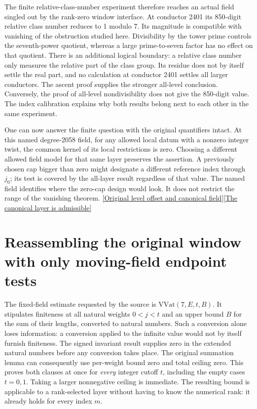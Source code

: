 \documentclass[12pt,letterpaper]{article}
\begin{document}
The finite relative-class-number experiment therefore reaches an actual field singled out by the rank-zero window interface. At conductor 2401 its 850-digit relative class number reduces to 1 modulo 7. Its magnitude is compatible with vanishing of the obstruction studied here. Divisibility by the tower prime controls the seventh-power quotient, whereas a large prime-to-seven factor has no effect on that quotient. There is an additional logical boundary: a relative class number only measures the relative part of the class group. Its residue does not by itself settle the real part, and no calculation at conductor 2401 settles all larger conductors. The ascent proof supplies the stronger all-level conclusion. Conversely, the proof of all-level nondivisibility does not give the 850-digit value. The index calibration explains why both results belong next to each other in the same experiment.

One can now answer the finite question with the original quantifiers intact. At this named degree-2058 field, for any allowed local datum with a nonzero integer twist, the common kernel of its local restrictions is zero. Choosing a different allowed field model for that same layer preserves the assertion. A previously chosen cap bigger than zero might designate a different reference index through \(j_0\); its test is covered by the all-layer result regardless of that value. The named field identifies where the zero-cap design would look. It does not restrict the range of the vanishing theorem. \href{https://github.com/nousentllc/riemann-hypothesis/blob/40e56bab026552e089d7afcfeff08d2defb9c005/src/Development/AutomorphicArithmetic/AutomorphicVarieties/NumberFieldTowers/XTwApplyApply.lean#L104-L116}{[Original level offset and canonical field]}\quad\href{https://github.com/nousentllc/riemann-hypothesis/blob/40e56bab026552e089d7afcfeff08d2defb9c005/src/Development/AutomorphicArithmetic/AutomorphicVarieties/NumberFieldTowers/LayerUniq.lean#L25-L29}{[The canonical layer is admissible]}

\section{Reassembling the original window with only moving-field endpoint tests}
\label{sec:only-moving}

The fixed-field estimate requested by the source is \(\mathrm{VVat}(7,E,t,B)\). It stipulates finiteness at all natural weights \(0<j<t\) and an upper bound \(B\) for the sum of their lengths, converted to natural numbers. Such a conversion alone loses information: a conversion applied to the infinite value would not by itself furnish finiteness. The signed invariant result supplies zero in the extended natural numbers before any conversion takes place. The original summation lemma can consequently use per-weight bound zero and total ceiling zero. This proves both clauses at once for \emph{every} integer cutoff \(t\), including the empty cases \(t=0,1\). Taking a larger nonnegative ceiling is immediate. The resulting bound is applicable to a rank-selected layer without having to know the numerical rank: it already holds for every index \(m\).
\end{document}
